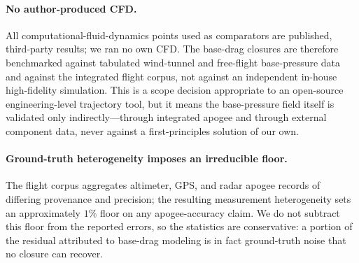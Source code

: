 \paragraph{No author-produced CFD.}
All computational-fluid-dynamics points used as comparators are published,
third-party results; we ran no own CFD. The base-drag closures are therefore
benchmarked against tabulated wind-tunnel and free-flight base-pressure data and
against the integrated flight corpus, not against an independent in-house
high-fidelity simulation. This is a scope decision appropriate to an open-source
engineering-level trajectory tool, but it means the base-pressure field itself
is validated only indirectly---through integrated apogee and through external
component data, never against a first-principles solution of our own.

\paragraph{Ground-truth heterogeneity imposes an irreducible floor.}
The flight corpus aggregates altimeter, GPS, and radar apogee records of
differing provenance and precision; the resulting measurement heterogeneity sets
an approximately $1\%$ floor on any apogee-accuracy claim. We do not subtract
this floor from the reported errors, so the statistics are conservative: a
portion of the residual attributed to base-drag modeling is in fact ground-truth
noise that no closure can recover.
